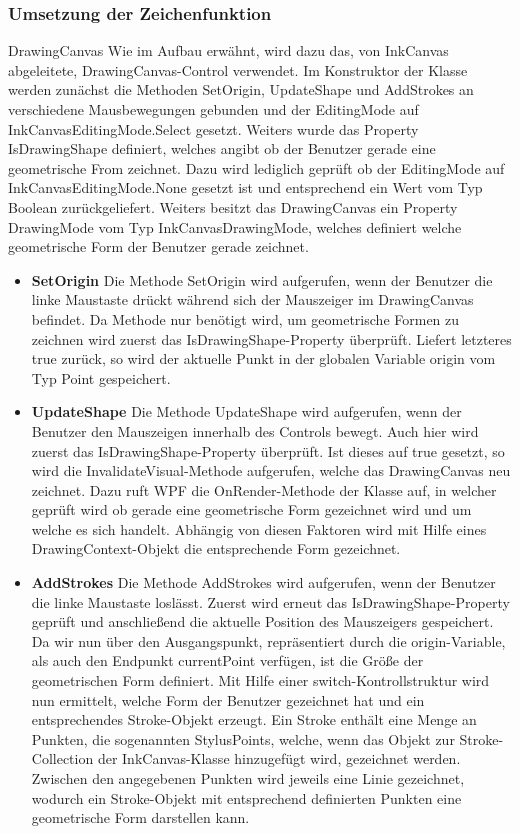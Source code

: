 \subsubsection{Umsetzung der Zeichenfunktion}

DrawingCanvas
Wie im Aufbau erwähnt, wird dazu das, von InkCanvas abgeleitete, DrawingCanvas-Control verwendet. Im Konstruktor der Klasse werden zunächst die Methoden SetOrigin, UpdateShape und AddStrokes an verschiedene Mausbewegungen gebunden und der EditingMode auf InkCanvasEditingMode.Select gesetzt. Weiters wurde das Property IsDrawingShape definiert, welches angibt ob der Benutzer gerade eine geometrische From zeichnet. Dazu wird lediglich geprüft ob der EditingMode auf InkCanvasEditingMode.None gesetzt ist und entsprechend ein Wert vom Typ Boolean zurückgeliefert. Weiters besitzt das DrawingCanvas ein Property DrawingMode vom Typ InkCanvasDrawingMode, welches definiert welche geometrische Form der Benutzer gerade zeichnet.
\begin{itemize}
\item \textbf{SetOrigin}
Die Methode SetOrigin wird aufgerufen, wenn der Benutzer die linke Maustaste drückt während sich der Mauszeiger im DrawingCanvas befindet. Da Methode nur benötigt wird, um geometrische Formen zu zeichnen wird zuerst das IsDrawingShape-Property überprüft. Liefert letzteres true zurück, so wird der aktuelle Punkt in der globalen Variable origin vom Typ Point gespeichert.
\item \textbf{UpdateShape}
Die Methode UpdateShape wird aufgerufen, wenn der Benutzer den Mauszeigen innerhalb des Controls bewegt. Auch hier wird zuerst das IsDrawingShape-Property überprüft. Ist dieses auf true gesetzt, so wird die InvalidateVisual-Methode aufgerufen, welche das DrawingCanvas neu zeichnet. Dazu ruft WPF die OnRender-Methode der Klasse auf, in welcher geprüft wird ob gerade eine geometrische Form gezeichnet wird und um welche es sich handelt. Abhängig von diesen Faktoren wird mit Hilfe eines DrawingContext-Objekt die entsprechende Form gezeichnet.
\item \textbf{AddStrokes}
Die Methode AddStrokes wird aufgerufen, wenn der Benutzer die linke Maustaste loslässt. Zuerst wird erneut das IsDrawingShape-Property geprüft und anschließend die aktuelle Position des Mauszeigers gespeichert. Da wir nun über den Ausgangspunkt, repräsentiert durch die origin-Variable, als auch den Endpunkt currentPoint verfügen, ist die Größe der geometrischen Form definiert.
Mit Hilfe einer switch-Kontrollstruktur wird nun ermittelt, welche Form der Benutzer gezeichnet hat und ein entsprechendes Stroke-Objekt erzeugt. Ein Stroke enthält eine Menge an Punkten, die sogenannten StylusPoints, welche, wenn das Objekt zur Stroke-Collection der InkCanvas-Klasse hinzugefügt wird, gezeichnet werden. Zwischen den angegebenen Punkten wird jeweils eine Linie gezeichnet, wodurch ein Stroke-Objekt mit entsprechend definierten Punkten eine geometrische Form darstellen kann.
\end{itemize}

